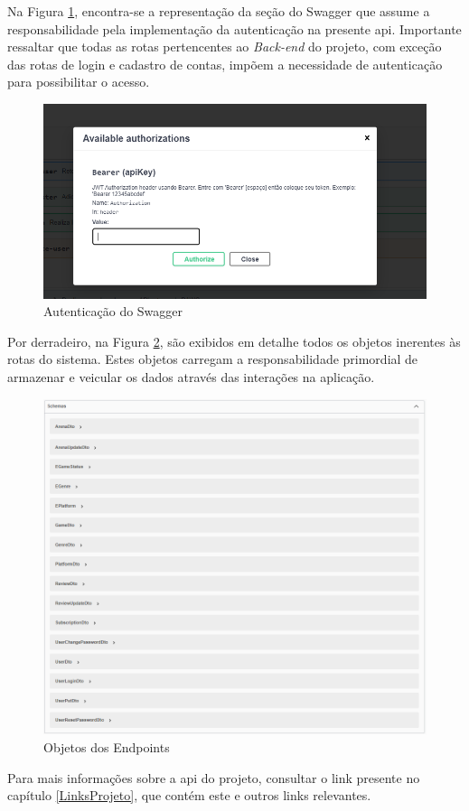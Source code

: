 Na Figura \ref{AutenticacaoSwagger}, encontra-se a representação da seção do \gls{Swagger} que assume a responsabilidade pela implementação da autenticação na presente \ac{api}. Importante ressaltar que todas as rotas pertencentes ao \textit{\gls{Back-end}} do projeto, com exceção das rotas de login e cadastro de contas, impõem a necessidade de autenticação para possibilitar o acesso.

\begin{figure}[H]
    \centering
	\caption{Autenticação do Swagger}
    \label{AutenticacaoSwagger}
    \includegraphics[scale = 0.6]{imagens/arquitetura/rotas_token.png}	
\end{figure}

Por derradeiro, na Figura \ref{ObjetosEndpoints}, são exibidos em detalhe todos os objetos inerentes às rotas do sistema. Estes objetos carregam a responsabilidade primordial de armazenar e veicular os dados através das interações na aplicação.

\begin{figure}[H]
    \centering
	\caption{Objetos dos Endpoints}
    \label{ObjetosEndpoints}
    \includegraphics[scale = 0.6]{imagens/arquitetura/rotas_schemas.png}	
\end{figure}

Para mais informações sobre a \ac{api} do projeto, consultar o link presente no capítulo \ref{LinksProjeto}, que contém este e outros links relevantes.